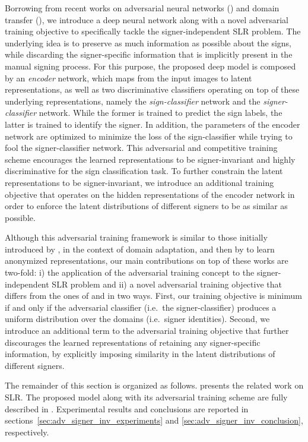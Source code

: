 Borrowing from recent works on adversarial neural networks (\citet{Goodfellow2014, Feutry2018}) and domain transfer (\citet{Ganin2015}), we introduce a deep neural network along with a novel adversarial training objective to specifically tackle the signer-independent SLR problem. The underlying idea is to preserve as much information as possible about the signs, while discarding the signer-specific information that is implicitly present in the manual signing process. For this purpose, the proposed deep model is composed by an \emph{encoder} network, which maps from the input images to latent representations, as well as two discriminative classifiers operating on top of these underlying representations, namely the \emph{sign-classifier} network and the \emph{signer-classifier} network. While the former is trained to predict the sign labels, the latter is trained to identify the signer. In addition, the parameters of the encoder network are optimized to minimize the loss of the sign-classifier while trying to fool the signer-classifier network. This adversarial and competitive training scheme encourages the learned representations to be signer-invariant and highly discriminative for the sign classification task. To further constrain the latent representations to be signer-invariant, we introduce an additional training objective that operates on the hidden representations of the encoder network in order to enforce the latent distributions of different signers to be as similar as possible.

Although this adversarial training framework is similar to those initially introduced by \citet{Ganin2015}, in the context of domain adaptation, and then by \citet{Feutry2018} to learn anonymized representations, our main contributions on top of these works are two-fold: i) the application of the adversarial training concept to the signer-independent SLR problem and ii) a novel adversarial training objective that differs from the ones of \citet{Ganin2015} and \citet{Feutry2018} in two ways. First, our training objective is minimum if and only if the adversarial classifier (i.e.\ the signer-classifier) produces a uniform distribution over the domains (i.e.\ signer identities). Second, we introduce an additional term to the adversarial training objective that further discourages the learned representations of retaining any signer-specific information, by explicitly imposing similarity in the latent distributions of different signers.

The remainder of this section is organized as follows.  presents the related work on SLR. The proposed model along with its adversarial training scheme are fully described in . Experimental results and conclusions are reported in sections~\ref{sec:adv_signer_inv_experiments} and \ref{sec:adv_signer_inv_conclusion}, respectively.

